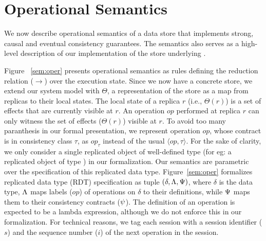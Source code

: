 \section{Operational Semantics}
\label{sec:store-opsem}

\renewcommand{\auxred}[4]{#1 \vdash #2 \;\xhookrightarrow{#3}\; #4 }

We now describe operational semantics of a data store that implements
strong, causal and eventual consistency guarantees. The semantics also
serves as a high-level description of our implementation of the store
underlying \name.

Figure ~\ref{sem:oper} presents operational semantics as rules
defining the reduction relation ($\xrightarrow{}$) over the execution
state.  Since we now have a concrete store, we extend our system model
with $\Theta$, a representation of the store as a map from replicas to
their local states. The local state of a replica $r$ (i.e.,
$\Theta(r)$) is a set of effects that are currently visible at $r$.
An operation $op$ performed at replica $r$ can only witness the set of
effects ($\Theta(r)$) visible at $r$. To avoid too many paranthesis in
our formal presentation, we represent operation $op$, whose contract
is in consistency class $\tau$, as $op_\tau$ instead of the usual
$\langle op,\tau \rangle$. For the sake of clarity, we only
consider a single replicated object of well-defined type (for eg: a
replicated object of type ) in our formalization.  Our
semantics are parametric over the specification of this replicated
data type. Figure~\ref{sem:oper} formalizes replicated data type (RDT)
specification as tuple $(\delta,\Lambda,\Psi)$, where $\delta$ is the
data type, $\Lambda$ maps labels ($op$) of operations on $\delta$ to
their definitions, while $\Psi$ maps them to their consistency
contracts ($\psi$). The definition of an operation is expected to be a
lambda expression, although we do not enforce this in our
formalization. For technical reasons, we tag each session with a
session identifier ($s$) and the sequence number ($i$) of the next
operation in the session.

